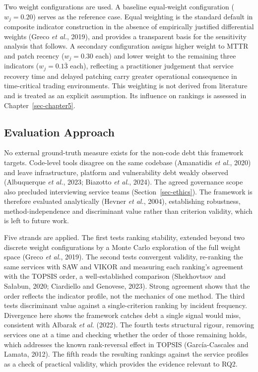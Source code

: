 \documentclass[
  12pt,
  letterpaper,
  12pt,
  oneside,
  english,
  onehalfspacing,
  headsepline]{MastersDoctoralThesis}
\begin{document}
Two weight configurations are used. A baseline equal-weight
configuration (\(w_j = 0.20\)) serves as the reference case. Equal
weighting is the standard default in composite indicator construction in
the absence of empirically justified differential weights (Greco
\emph{et al.}, 2019), and provides a transparent basis for the
sensitivity analysis that follows. A secondary configuration assigns
higher weight to MTTR and patch recency (\(w_j = 0.30\) each) and lower
weight to the remaining three indicators (\(w_j = 0.1\overline{3}\)
each), reflecting a practitioner judgement that service recovery time
and delayed patching carry greater operational consequence in
time-critical trading environments. This weighting is not derived from
literature and is treated as an explicit assumption. Its influence on
rankings is assessed in Chapter~\ref{sec-chapter5}.

\subsection{Evaluation Approach}\label{sec-evaluationapproach}

No external ground-truth measure exists for the non-code debt this
framework targets. Code-level tools disagree on the same codebase
(Amanatidis \emph{et al.}, 2020) and leave infrastructure, platform and
vulnerability debt weakly observed (Albuquerque \emph{et al.}, 2023;
Biazotto \emph{et al.}, 2024). The agreed governance scope also
precluded interviewing service teams (Section~\ref{sec-ethics}). The
framework is therefore evaluated analytically (Hevner \emph{et al.},
2004), establishing robustness, method-independence and discriminant
value rather than criterion validity, which is left to future work.

Five strands are applied. The first tests ranking stability, extended
beyond two discrete weight configurations by a Monte Carlo exploration
of the full weight space (Greco \emph{et al.}, 2019). The second tests
convergent validity, re-ranking the same services with SAW and VIKOR and
measuring each ranking's agreement with the TOPSIS order, a
well-established comparison (Shekhovtsov and Sałabun, 2020; Ciardiello
and Genovese, 2023). Strong agreement shows that the order reflects the
indicator profile, not the mechanics of one method. The third tests
discriminant value against a single-criterion ranking by incident
frequency. Divergence here shows the framework catches debt a single
signal would miss, consistent with Albarak \emph{et al.} (2022). The
fourth tests structural rigour, removing services one at a time and
checking whether the order of those remaining holds, which addresses the
known rank-reversal effect in TOPSIS (García-Cascales and Lamata, 2012).
The fifth reads the resulting rankings against the service profiles as a
check of practical validity, which provides the evidence relevant to
RQ2.
\end{document}
